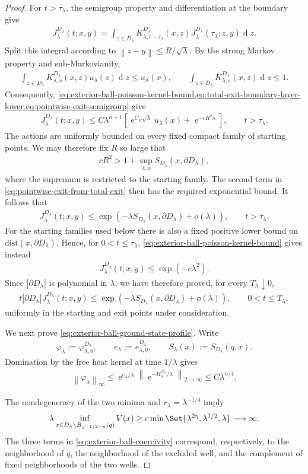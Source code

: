 \documentclass[a4paper,10pt]{article}
\numberwithin{equation}{section}
\theoremstyle{plain}
\theoremstyle{plain}
\theoremstyle{plain}
\theoremstyle{plain}
\theoremstyle{plain}
\theoremstyle{remark}
\theoremstyle{definition}
\newcommand{\ee}{\operatorname{e}}
\newcommand\norm[1]{\left\lVert#1\right\rVert}
\newcommand{\dif}{\operatorname{d}\!} %
\newcommand{\vf}{\varphi}
\newcommand{\dist}{\mathrm{dist}}
\newcommand{\abs}[1]{\left\lvert#1\right\rvert}
\newcommand{\eq}[1]{\begin{align*}#1\end{align*}}
\newcommand{\eql}[1]{\begin{align}#1\end{align}}
\newcommand{\br}[1]{\left(#1\right)}
\begin{document}
\begin{proof}
For $t>\tau_\lambda$, the semigroup property and differentiation at
the boundary give
\eql{
J_\lambda^{D_\lambda}(t;x,y)
=
\int_{z\in D_\lambda}
K_{\lambda,t-\tau_\lambda}^{D_\lambda}(x,z)
J_\lambda^{D_\lambda}(\tau_\lambda;z,y)
\dif{z}.
\label{eq:pointwise-exit-semigroup}
}
Split this integral according to
$\norm{z-y}\leq R/\sqrt\lambda$. By the strong Markov property and
sub-Markovianity,
\eq{
\int_{z\in D_\lambda}
K_{\lambda,s}^{D_\lambda}(x,z)u_\lambda(z)\dif{z}
\leq
u_\lambda(x),
\qquad
\int_{z\in D_\lambda}
K_{\lambda,s}^{D_\lambda}(x,z)\dif{z}
\leq
1.
}
Consequently,
\cref{eq:exterior-ball-poisson-kernel-bound,eq:total-exit-boundary-layer-lower,eq:pointwise-exit-semigroup}
give
\eql{
J_\lambda^{D_\lambda}(t;x,y)
\leq
C\lambda^{n+1}
\left[
\ee^{C_R\sqrt\lambda}u_\lambda(x)
+
\ee^{-cR^2\lambda}
\right],
\qquad
t>\tau_\lambda.
\label{eq:pointwise-exit-from-total-exit}
}
The actions are uniformly bounded on every fixed compact family of
starting points. We may therefore fix $R$ so large that
\eq{
cR^2
>
1+
\sup_{\lambda,x}
S_{D_\lambda}\br{x,\partial D_\lambda},
}
where the supremum is restricted to the starting family. The second
term in \cref{eq:pointwise-exit-from-total-exit} then has the required
exponential bound. It follows that
\eq{
J_\lambda^{D_\lambda}(t;x,y)
\leq
\exp\left(
-\lambda S_{D_\lambda}\br{x,\partial D_\lambda}
+o(\lambda)
\right),
\qquad
t>\tau_\lambda.
}
For the starting families used below there is also a fixed positive
lower bound on $\dist(x,\partial D_\lambda)$. Hence, for
$0<t\leq\tau_\lambda$,
\cref{eq:exterior-ball-poisson-kernel-bound} gives instead
\eq{
J_\lambda^{D_\lambda}(t;x,y)
\leq
\exp\br{-c\lambda^2}.
}
Since $\abs{\partial D_\lambda}$ is polynomial in $\lambda$, we have
therefore proved, for every $T_\lambda\downarrow0$,
\eql{
t\abs{\partial D_\lambda}
J_\lambda^{D_\lambda}(t;x,y)
\leq
\exp\left(
-\lambda S_{D_\lambda}\br{x,\partial D_\lambda}
+o(\lambda)
\right),
\qquad
0<t\leq T_\lambda,
\label{eq:pointwise-first-exit-bound}
}
uniformly in the starting and exit points under consideration.

We next prove
\cref{eq:exterior-ball-ground-state-profile}. Write
\eq{
\vf_\lambda
:=
\vf_{\lambda,0}^{D_\lambda},
\qquad
e_\lambda
:=
e_{\lambda,0}^{D_\lambda},
\qquad
S_\lambda(x)
:=
S_{D_\lambda}(q,x).
}
Domination by the free heat kernel at time $1/\lambda$ gives
\eq{
\norm{\vf_\lambda}_\infty
\leq
\ee^{e_\lambda/\lambda}
\norm{
\ee^{-H_\lambda^{D_\lambda}/\lambda}
}_{2\to\infty}
\leq
C\lambda^{n/4}.
}

The nondegeneracy of the two minima and
$r_\lambda=\lambda^{-1/4}$ imply
\eql{
\lambda
\inf_{
x\in
D_\lambda
\setminus
B_{\lambda^{-1/2+\eta}}(q)
}
V(x)
\geq
c
\min\Set{
\lambda^{2\eta},
\lambda^{1/2},
\lambda
}
\longrightarrow
\infty.
\label{eq:exterior-ball-coercivity}
}
The three terms in
\cref{eq:exterior-ball-coercivity} correspond, respectively, to the
neighborhood of $q$, the neighborhood of the excluded well, and the
complement of fixed neighborhoods of the two wells.


\end{proof}
\end{document}
